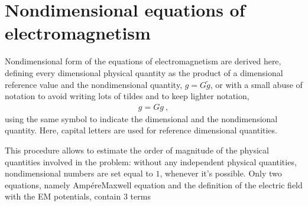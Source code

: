 \documentclass[letterpaper,10pt,english]{jupyterBook}
\begin{document}
\sphinxstepscope


\section{Non\sphinxhyphen{}dimensional equations of electromagnetism}
\label{\detokenize{ch/regimes-non-dimensional:non-dimensional-equations-of-electromagnetism}}\label{\detokenize{ch/regimes-non-dimensional:classical-electromagnetism-regimes-non-dimensional}}\label{\detokenize{ch/regimes-non-dimensional::doc}}
\sphinxAtStartPar
Non\sphinxhyphen{}dimensional form of the equations of electromagnetism are derived here, defining every dimensional physical quantity as the product of a dimensional reference value and the non\sphinxhyphen{}dimensional quantity, \(g = G \widetilde{g}\), or with a small abuse of notation to avoid writing lots of tildes and to keep lighter notation,
\begin{equation*}
\begin{split}g = G g \ ,\end{split}
\end{equation*}
\sphinxAtStartPar
using the same symbol to indicate the dimensional and the non\sphinxhyphen{}dimensional quantity. Here, capital letters are used for reference dimensional quantities.

\sphinxAtStartPar
This procedure allows to estimate the order of magnitude of the physical quantities involved in the problem: without any independent physical quantities, non\sphinxhyphen{}dimensional numbers are set equal to \(1\), whenever it’s possible. Only two equations, namely Ampére\sphinxhyphen{}Maxwell equation and the definition of the electric field with the EM potentials, contain 3 terms
\end{document}
